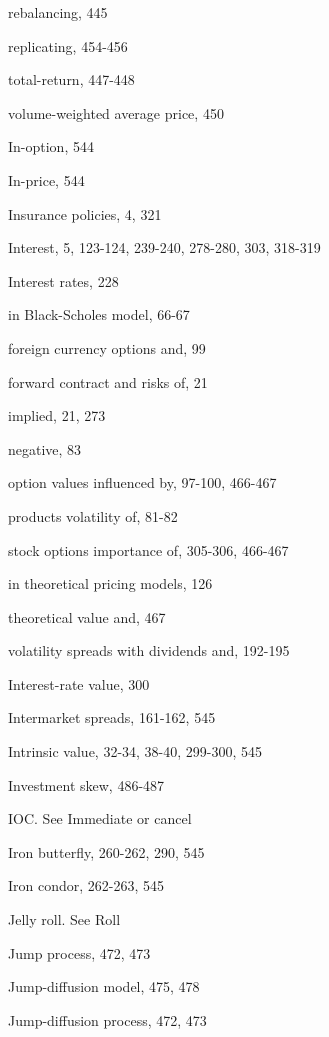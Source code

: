 \noindent rebalancing, 445\par
\noindent replicating, 454-456\par
\noindent total-return, 447-448\par
\noindent volume-weighted average price, 450\par
\noindent In-option, 544\par
\noindent In-price, 544\par
\noindent Insurance policies, 4, 321\par
\noindent Interest, 5, 123-124, 239-240, 278-280, 303, 318-319\par
\noindent Interest rates, 228\par
\noindent in Black-Scholes model, 66-67\par
\noindent foreign currency options and, 99\par
\noindent forward contract and risks of, 21\par
\noindent implied, 21, 273\par
\noindent negative, 83\par
\noindent option values influenced by, 97-100, 466-467\par
\noindent products volatility of, 81-82\par
\noindent stock options importance of, 305-306, 466-467\par
\noindent in theoretical pricing models, 126\par
\noindent theoretical value and, 467\par
\noindent volatility spreads with dividends and, 192-195\par
\noindent Interest-rate value, 300\par
\noindent Intermarket spreads, 161-162, 545\par
\noindent Intrinsic value, 32-34, 38-40, 299-300, 545\par
\noindent Investment skew, 486-487\par
\noindent IOC. See Immediate or cancel\par
\noindent Iron butterfly, 260-262, 290, 545\par
\noindent Iron condor, 262-263, 545\par
\noindent Jelly roll. See Roll\par
\noindent Jump process, 472, 473\par
\noindent Jump-diffusion model, 475, 478\par
\noindent Jump-diffusion process, 472, 473\par

